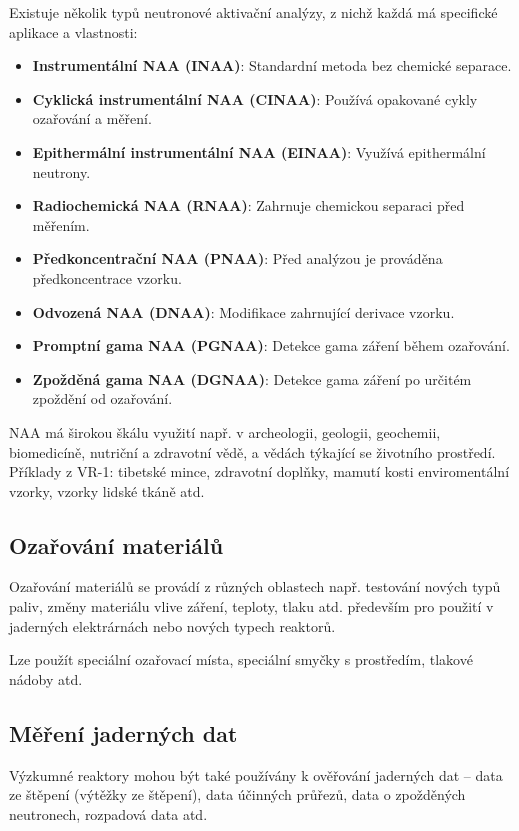 Existuje několik typů neutronové aktivační analýzy, z nichž každá má specifické aplikace a vlastnosti:

\begin{itemize}
    \item \textbf{Instrumentální NAA (INAA)}: Standardní metoda bez chemické separace.
    \item \textbf{Cyklická instrumentální NAA (CINAA)}: Používá opakované cykly ozařování a měření.
    \item \textbf{Epithermální instrumentální NAA (EINAA)}: Využívá epithermální neutrony.
    \item \textbf{Radiochemická NAA (RNAA)}: Zahrnuje chemickou separaci před měřením.
    \item \textbf{Předkoncentrační NAA (PNAA)}: Před analýzou je prováděna předkoncentrace vzorku.
    \item \textbf{Odvozená NAA (DNAA)}: Modifikace zahrnující derivace vzorku.
    \item \textbf{Promptní gama NAA (PGNAA)}: Detekce gama záření během ozařování.
    \item \textbf{Zpožděná gama NAA (DGNAA)}: Detekce gama záření po určitém zpoždění od ozařování.
\end{itemize}

NAA má širokou škálu využití např. v archeologii, geologii, geochemii, biomedicíně, nutriční a zdravotní vědě, a vědách týkající se životního prostředí. Příklady z VR-1: tibetské mince, zdravotní doplňky, mamutí kosti enviromentální vzorky, vzorky lidské tkáně atd.

\subsection{Ozařování materiálů}

Ozařování materiálů se provádí z různých oblastech např. testování nových typů paliv, změny materiálu vlive záření, teploty, tlaku atd. především pro použití v jaderných elektrárnách nebo nových typech reaktorů.

Lze použít speciální ozařovací místa, speciální smyčky s prostředím, tlakové nádoby atd.

\subsection{Měření jaderných dat}

Výzkumné reaktory mohou být také používány k ověřování jaderných dat -- data ze štěpení (výtěžky ze štěpení), data účinných průřezů, data o zpožděných neutronech, rozpadová data atd.


